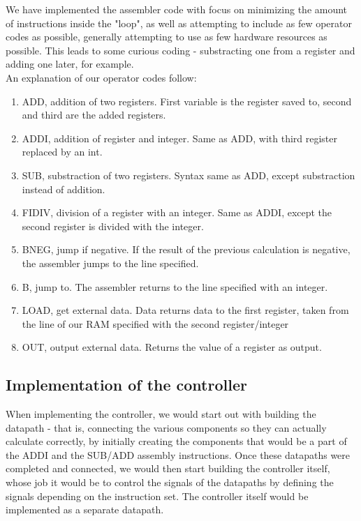 \documentclass[12pt,a4paper]{article}
\begin{document}
We have implemented the assembler code with focus on minimizing the amount of instructions inside the "loop", as well as attempting to include as few operator codes as possible, generally attempting to use as few hardware resources as possible. This leads to some curious coding - substracting one from a 
register and adding one later, for example.\\
An explanation of our operator codes follow:\\
\begin{enumerate}
\item ADD, addition of two registers. First variable is the register saved to, second and third are the added registers.
\item ADDI, addition of register and integer. Same as ADD, with third register replaced by an int.
\item SUB, substraction of two registers. Syntax same as ADD, except substraction instead of addition.
\item FIDIV, division of a register with an integer. Same as ADDI, except the second register is divided with the integer.
\item BNEG, jump if negative. If the result of the previous calculation is negative, the assembler jumps to the line specified.
\item B, jump to. The assembler returns to the line specified with an integer.
\item LOAD, get external data. Data returns data to the first register, taken from the line of our RAM specified with the second register/integer
\item OUT, output external data. Returns the value of a register as output.
\end{enumerate}
\subsection{Implementation of the controller}
When implementing the controller, we would start out with building the datapath - that is, connecting the various components so they can actually calculate correctly, by initially creating the components that would be a part of the ADDI and the SUB/ADD assembly instructions. Once these datapaths were completed and connected, we would then start building the controller itself, whose job it would be to control the signals of the datapaths by defining the signals depending on the instruction set. The controller itself would be implemented as a separate datapath.
\end{document}
